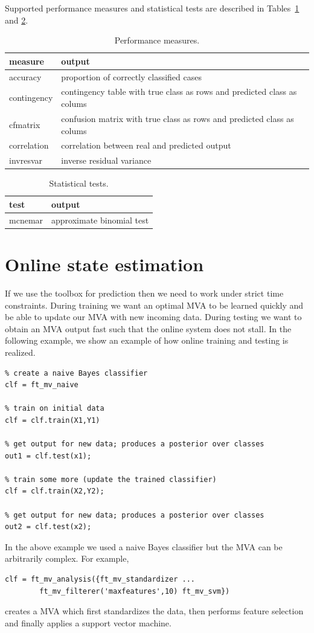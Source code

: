 \documentclass{article}
\begin{document}
Supported performance measures and statistical tests are described in Tables~\ref{tab:measure} and \ref{tab:test}.
\begin{table}[ht]
\centering
\caption{Performance measures.}
\begin{tabular}{p{}|p{}}
{\bf measure} & {\bf output}\\
\hline
accuracy &proportion of correctly classified cases\\
contingency & contingency table with true class as rows and predicted class as colums\\
cfmatrix & confusion matrix with true class as rows and predicted class as colums\\
correlation & correlation between real and predicted output\\
invresvar & inverse residual variance
\end{tabular}
\label{tab:measure}
\end{table}

\begin{table}[ht]
\centering
\caption{Statistical tests.}
\begin{tabular}{p{}|p{}}
{\bf test} & {\bf output}\\
\hline
mcnemar & approximate binomial test
\end{tabular}
\label{tab:test}
\end{table}


\section{Online state estimation}

If we use the toolbox for prediction then we need to work under strict time constraints. During training we want an optimal MVA to be learned quickly and be able to update our MVA with new incoming data. During testing we want to obtain an MVA output fast such that the online system does not stall. In the following example, we show an example of how online training and testing is realized.
\begin{verbatim}
% create a naive Bayes classifier
clf = ft_mv_naive

% train on initial data
clf = clf.train(X1,Y1)

% get output for new data; produces a posterior over classes
out1 = clf.test(x1);

% train some more (update the trained classifier)
clf = clf.train(X2,Y2);

% get output for new data; produces a posterior over classes
out2 = clf.test(x2);
\end{verbatim}
In the above example we used a naive Bayes classifier but the MVA can be arbitrarily complex. For example, 
\begin{verbatim}
clf = ft_mv_analysis({ft_mv_standardizer ...
        ft_mv_filterer('maxfeatures',10) ft_mv_svm})
\end{verbatim}
creates a MVA which first standardizes the data, then performs feature selection and finally applies a support vector machine.
\end{document}
